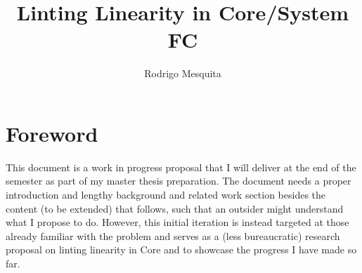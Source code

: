 \documentclass[a4paper, draft]{article}
\title{Linting Linearity in Core/System FC}
\author{Rodrigo Mesquita}
\begin{document}
\maketitle









\section{Foreword}

This document is a work in progress proposal that I will deliver at the end of
the semester as part of my master thesis preparation. The document needs a
proper introduction and lengthy background and related work section besides the
content (to be extended) that follows, such that an outsider might understand
what I propose to do. However, this initial iteration is instead targeted at
those already familiar with the problem and serves as a (less bureaucratic)
research proposal on linting linearity in Core and to showcase the progress I
have made so far.
\end{document}
